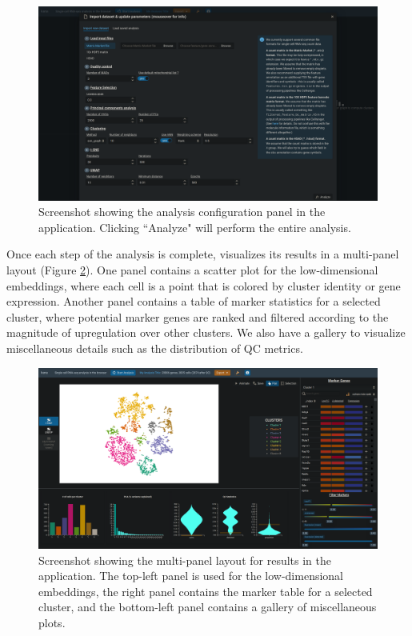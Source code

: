 \documentclass{article}
\begin{document}
\begin{figure}[htbp]
\begin{center}
\includegraphics[width=\textwidth]{screenshots/analysis.png}
\end{center}
\caption{Screenshot showing the analysis configuration panel in the  application.
Clicking ``Analyze" will perform the entire analysis.}
\label{screenshot:analysis}
\end{figure}

Once each step of the analysis is complete,  visualizes its results in a multi-panel layout (Figure \ref{screenshot:results}).
One panel contains a scatter plot for the low-dimensional embeddings, where each cell is a point that is colored by cluster identity or gene expression.
Another panel contains a table of marker statistics for a selected cluster, where potential marker genes are ranked and filtered according to the magnitude of upregulation over other clusters.
We also have a gallery to visualize miscellaneous details such as the distribution of QC metrics.

\begin{figure}[htbp]
\begin{center}
\includegraphics[width=\textwidth]{screenshots/results.png}
\end{center}
\caption{Screenshot showing the multi-panel layout for results in the  application.
The top-left panel is used for the low-dimensional embeddings,
the right panel contains the marker table for a selected cluster,
and the bottom-left panel contains a gallery of miscellaneous plots.}
\label{screenshot:results}
\end{figure}
\end{document}
